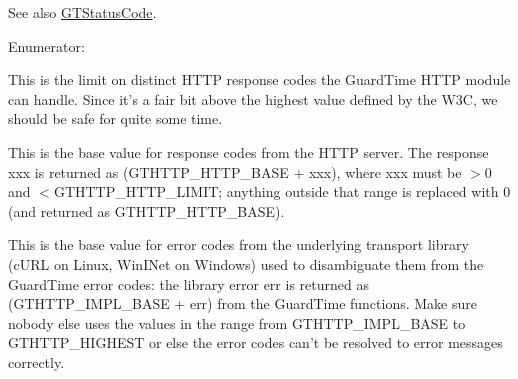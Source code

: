 \begin{DoxySeeAlso}{See also}
\hyperlink{group__common_ga43b0c0f44bcf02caf0c2866b1f647a35}{GTStatusCode}. 
\end{DoxySeeAlso}
\begin{Desc}
\item[Enumerator: ]\par
\begin{description}
\item[{\em 
\hypertarget{group__http_gga9f42032eb2905e40ee6fe84e0dfc03c2a26adede81bf1a9366ba5c694071e7f7c}{
GTHTTP\_\-HTTP\_\-LIMIT}
\label{group__http_gga9f42032eb2905e40ee6fe84e0dfc03c2a26adede81bf1a9366ba5c694071e7f7c}
}]This is the limit on distinct HTTP response codes the GuardTime HTTP module can handle. Since it's a fair bit above the highest value defined by the W3C, we should be safe for quite some time. \item[{\em 
\hypertarget{group__http_gga9f42032eb2905e40ee6fe84e0dfc03c2a196935519731c1937ef788ec01bf8e36}{
GTHTTP\_\-HTTP\_\-BASE}
\label{group__http_gga9f42032eb2905e40ee6fe84e0dfc03c2a196935519731c1937ef788ec01bf8e36}
}]This is the base value for response codes from the HTTP server. The response {\ttfamily xxx} is returned as {\ttfamily }(GTHTTP\_\-HTTP\_\-BASE + xxx), where xxx must be $>$0 and $<$GTHTTP\_\-HTTP\_\-LIMIT; anything outside that range is replaced with 0 (and returned as GTHTTP\_\-HTTP\_\-BASE). \item[{\em 
\hypertarget{group__http_gga9f42032eb2905e40ee6fe84e0dfc03c2a85676a04ec8467d5f486dbbb33b63a79}{
GTHTTP\_\-IMPL\_\-BASE}
\label{group__http_gga9f42032eb2905e40ee6fe84e0dfc03c2a85676a04ec8467d5f486dbbb33b63a79}
}]This is the base value for error codes from the underlying transport library (cURL on Linux, WinINet on Windows) used to disambiguate them from the GuardTime error codes: the library error {\ttfamily err} is returned as {\ttfamily }(GTHTTP\_\-IMPL\_\-BASE + err) from the GuardTime functions. Make sure nobody else uses the values in the range from {\ttfamily GTHTTP\_\-IMPL\_\-BASE} to {\ttfamily GTHTTP\_\-HIGHEST} or else the error codes can't be resolved to error messages correctly. \end{description}
\end{Desc}



